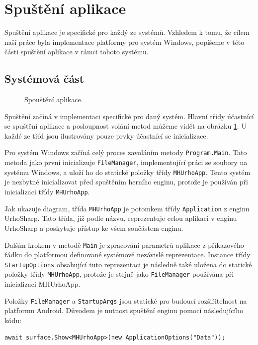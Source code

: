\section{Spuštění aplikace}
\label{sec:init}
Spuštění aplikace je specifické pro každý ze systémů. Vzhledem k tomu, že cílem naší práce byla implementace platformy pro systém Windows, popíšeme v této části spuštění aplikace v rámci tohoto systému.

\subsection{Systémová část}

\begin{figure}[h]
	\centering
	\fontsize{8pt}{11pt}\selectfont
	\def\svgwidth{\textwidth}
	
	\caption{Spouštění aplikace.}
	\label{fig:startup}
\end{figure}

Spuštění začíná v implementaci specifické pro daný systém. Hlavní třídy účastnící se spuštění aplikace a posloupnost volání metod můžeme vidět na obrázku \ref{fig:startup}. U každé ze tříd jsou ilustrovány pouze prvky účastnící se inicializace. 

Pro systém Windows začíná celý proces zavoláním metody \texttt{Program.Main}. Tato metoda jako první inicializuje \texttt{FileManager}, implementující práci se soubory na systému Windows, a uloží ho do statické položky třídy \texttt{MHUrhoApp}. Tento systém je nezbytné inicializovat před spuštěním herního enginu, protože je používán při inicializaci třídy \texttt{MHUrhoApp}.

Jak ukazuje diagram, třída \texttt{MHUrhoApp} je potomkem třídy \texttt{Application} z enginu UrhoSharp. Tato třída, již podle názvu, reprezentuje celou aplikaci v enginu UrhoSharp a poskytuje přístup ke všem součástem enginu. 

Dalším krokem v metodě \texttt{Main} je zpracování parametrů aplikace z příkazového řádku do platformou definované systémově nezávislé reprezentace. Instance třídy \texttt{StartupOptions} obsahující tuto reprezentaci je následně také uložena do statické položky třídy \texttt{MHUrhoApp}, protože je stejně jako \texttt{FileManager} používána při inicializaci MHUrhoApp.

Položky \texttt{FileManager} a \texttt{StartupArgs} jsou statické pro budoucí rozšiřitelnost na platformu Android.
Důvodem je nutnost spuštění enginu pomocí následujícího kódu:

\begin{lstlisting}[]
await surface.Show<MHUrhoApp>(new ApplicationOptions("Data"));
\end{lstlisting}

